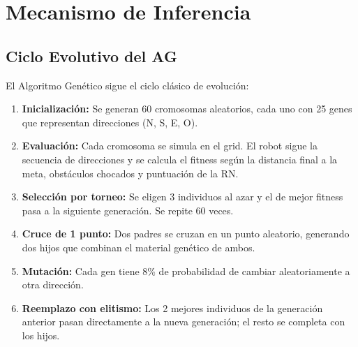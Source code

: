 \documentclass[12pt,a4paper]{article}
\begin{document}
\section{Mecanismo de Inferencia}

\subsection{Ciclo Evolutivo del AG}

El Algoritmo Gen\'etico sigue el ciclo cl\'asico de evoluci\'on:

\begin{enumerate}
  \item \textbf{Inicializaci\'on:} Se generan 60 cromosomas aleatorios, cada uno con 25 genes que representan direcciones (N, S, E, O).
  \item \textbf{Evaluaci\'on:} Cada cromosoma se simula en el grid. El robot sigue la secuencia de direcciones y se calcula el fitness seg\'un la distancia final a la meta, obst\'aculos chocados y puntuaci\'on de la RN.
  \item \textbf{Selecci\'on por torneo:} Se eligen 3 individuos al azar y el de mejor fitness pasa a la siguiente generaci\'on. Se repite 60 veces.
  \item \textbf{Cruce de 1 punto:} Dos padres se cruzan en un punto aleatorio, generando dos hijos que combinan el material gen\'etico de ambos.
  \item \textbf{Mutaci\'on:} Cada gen tiene 8\% de probabilidad de cambiar aleatoriamente a otra direcci\'on.
  \item \textbf{Reemplazo con elitismo:} Los 2 mejores individuos de la generaci\'on anterior pasan directamente a la nueva generaci\'on; el resto se completa con los hijos.
\end{enumerate}
\end{document}
